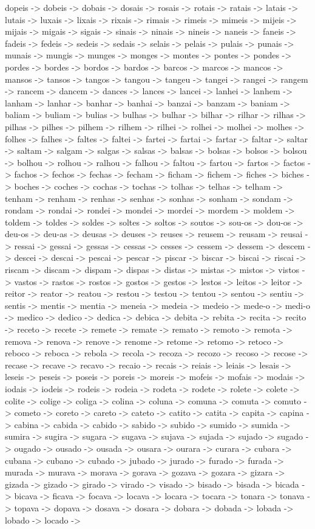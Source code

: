 \documentclass[a4paper,11pt]{article}
\begin{document}
dopeis -> dobeis -> dobais -> dosais -> rosais -> rotais -> ratais -> latais -> lutais -> luxais -> lixais -> rixais -> rimais -> rimeis -> mimeis -> mijeis -> mijais -> migais -> sigais -> sinais -> ninais -> nineis -> naneis -> faneis -> fadeis -> fedeis -> sedeis -> sedais -> selais -> pelais -> pulais -> punais -> munais -> mungis -> munges -> monges -> montes -> pontes -> pondes -> pordes -> bordes -> bordos -> bardos -> barcos -> marcos -> mancos -> mansos -> tansos -> tangos -> tangou -> tangeu -> tangei -> rangei -> rangem -> rancem -> dancem -> dances -> lances -> lancei -> lanhei -> lanhem -> lanham -> lanhar -> banhar -> banhai -> banzai -> banzam -> baniam -> baliam -> buliam -> bulias -> bulhas -> bulhar -> bilhar -> rilhar -> rilhas -> pilhas -> pilhes -> pilhem -> rilhem -> rilhei -> rolhei -> molhei -> molhes -> folhes -> falhes -> faltes -> faltei -> fartei -> fartai -> fartar -> faltar -> saltar -> saltam -> salgam -> salgas -> salsas -> balsas -> bolsas -> bolsos -> bolsou -> bolhou -> rolhou -> ralhou -> falhou -> faltou -> fartou -> fartos -> factos -> fachos -> fechos -> fechas -> fecham -> ficham -> fichem -> fiches -> biches -> boches -> coches -> cochas -> tochas -> tolhas -> telhas -> telham -> tenham -> renham -> renhas -> senhas -> sonhas -> sonham -> sondam -> rondam -> rondai -> rondei -> mondei -> mordei -> mordem -> moldem -> toldem -> toldes -> soldes -> soltes -> soltos -> soutos -> sou-os -> dou-os -> deu-os -> deu-as -> deusas -> deuses -> reuses -> reusem -> reusam -> reusai -> ressai -> gessai -> gessas -> cessas -> cesses -> cessem -> dessem -> descem -> descei -> descai -> pescai -> pescar -> piscar -> biscar -> biscai -> riscai -> riscam -> discam -> dispam -> dispas -> distas -> mistas -> mistos -> vistos -> vastos -> rastos -> rostos -> gostos -> gestos -> lestos -> leitos -> leitor -> reitor -> reator -> reatou -> restou -> testou -> tentou -> sentou -> sentiu -> sentis -> mentis -> mentia -> meneia -> medeia -> medeio -> mede-o -> medi-o -> medico -> dedico -> dedica -> debica -> debita -> rebita -> recita -> recito -> receto -> recete -> remete -> remate -> remato -> remoto -> remota -> remova -> renova -> renove -> renome -> retome -> retomo -> retoco -> reboco -> reboca -> rebola -> recola -> recoza -> recozo -> recoso -> recose -> recase -> recave -> recavo -> recaio -> recais -> reiais -> leiais -> lesais -> leseis -> peseis -> poseis -> poreis -> moreis -> mofeis -> mofais -> modais -> iodais -> iodeis -> rodeis -> rodeia -> rodeta -> rodete -> rolete -> colete -> colite -> colige -> coliga -> colina -> coluna -> comuna -> comuta -> comuto -> cometo -> coreto -> careto -> cateto -> catito -> catita -> capita -> capina -> cabina -> cabida -> cabido -> sabido -> subido -> sumido -> sumida -> sumira -> sugira -> sugara -> sugava -> sujava -> sujada -> sujado -> sugado -> ougado -> ousado -> ousada -> ousara -> ourara -> curara -> cubara -> cubana -> cubano -> cubado -> jubado -> jurado -> furado -> furada -> murada -> murava -> morava -> gorava -> gozava -> gozara -> gizara -> gizada -> gizado -> girado -> virado -> visado -> bisado -> bisada -> bicada -> bicava -> ficava -> focava -> locava -> locara -> tocara -> tonara -> tonava -> topava -> dopava -> dosava -> dosara -> dobara -> dobada -> lobada -> lobado -> locado -> 
\end{document}

